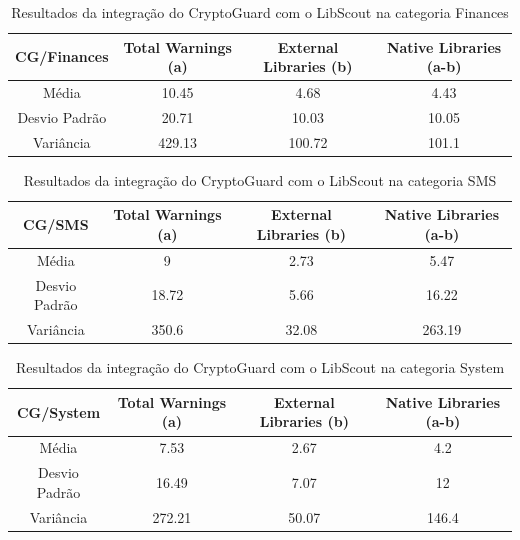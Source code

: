 \begin{table}[!htbp]
  \centering
  \small
  \begin{tabular}{|c|c|c|c|}
    \hline
    \textbf{CG/Finances} & \textbf{Total Warnings (a)} & \textbf{External Libraries (b)} & \textbf{Native Libraries (a-b)} \\
    \hline
    Média & \num{10.45} & \num{4.68} & \num{4.43} \\
    Desvio Padrão & \num{20.71} & \num{10.03} & \num{10.05} \\
    Variância & \num{429.13} & \num{100.72} & \num{101.1} \\
    \hline
  \end{tabular}
  \caption{Resultados da integração do CryptoGuard com o LibScout na categoria Finances}
  \label{table: AplicativosComWarningCGF}
\end{table}


\begin{table}[!htbp]
  \centering
  \small
  \begin{tabular}{|c|c|c|c|}
    \hline
    \textbf{CG/SMS} & \textbf{Total Warnings (a)} & \textbf{External Libraries (b)} & \textbf{Native Libraries (a-b)} \\
    \hline
    Média & \num{9} & \num{2.73} & \num{5.47} \\
    Desvio Padrão & \num{18.72} & \num{5.66} & \num{16.22} \\
    Variância & \num{350.6} & \num{32.08} & \num{263.19} \\
    \hline
  \end{tabular}
  \caption{Resultados da integração do CryptoGuard com o LibScout na categoria SMS}
  \label{table: AplicativosComWarningCGSMS}
\end{table}


\begin{table}[!htbp]
  \centering
  \small
  \begin{tabular}{|c|c|c|c|}
    \hline
    \textbf{CG/System} & \textbf{Total Warnings (a)} & \textbf{External Libraries (b)} & \textbf{Native Libraries (a-b)} \\
    \hline
    Média & \num{7.53} & \num{2.67} & \num{4.2} \\
    Desvio Padrão & \num{16.49} & \num{7.07} & \num{12} \\
    Variância & \num{272.21} & \num{50.07} & \num{146.4} \\
    \hline
  \end{tabular}
  \caption{Resultados da integração do CryptoGuard com o LibScout na categoria System}
  \label{table: AplicativosComWarningCGS}
\end{table}

